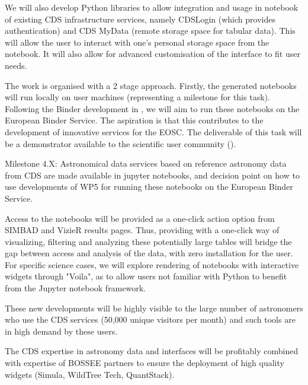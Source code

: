 \begin{task}[
  title=Astronomy application,
  id=astro,
  lead=CDS,
  PM=18,
  wphases={0-48},
  partners={QS,WTT,SRL}
]
  We will also develop Python libraries to allow integration and usage in
  notebook of existing CDS infrastructure services, namely CDSLogin (which
  provides authentication) and CDS MyData (remote storage space for tabular
  data).
  This will allow the user to interact with one's personal storage space from
  the notebook. It will also allow for advanced customisation of the interface 
  to fit user needs.

  The work is organised with a 2 stage approach. Firstly, the generated 
  notebooks will run locally on user machines (representing a milestone for 
  this task). Following the Binder development in , we will aim 
  to run these notebooks on the European Binder Service. The aspiration is 
  that this contributes to the development of innovative services for the EOSC.
  The deliverable of this task will be a demonstrator available to the 
  scientific user community ().

  Milestone 4.X: Astronomical data services based on reference astronomy data from CDS are made available in jupyter notebooks, and decision point on how to use developments of WP5 for running these notebooks on the European Binder Service.



  Access to the notebooks will be provided as a one-click action option from
  SIMBAD and VizieR results pages.
  Thus, providing with a one-click way of visualizing, filtering and analyzing
these potentially large tables will bridge the gap between access and analysis
of the data, with zero installation for the user.
  For specific science cases, we will explore rendering of notebooks with 
  interactive widgets through "Voila", as to allow users not familiar with 
  Python to benefit from the Jupyter notebook framework.

  These new developments will be highly visible to the large number of astronomers who use the CDS services (50,000 unique visitors per month) and such tools are in high demand by these users.

  The CDS expertise in astronomy data and interfaces will be profitably combined with expertise of BOSSEE partners to ensure the deployment of high quality widgets (Simula, WildTree Tech, QuantStack).



\end{task}
